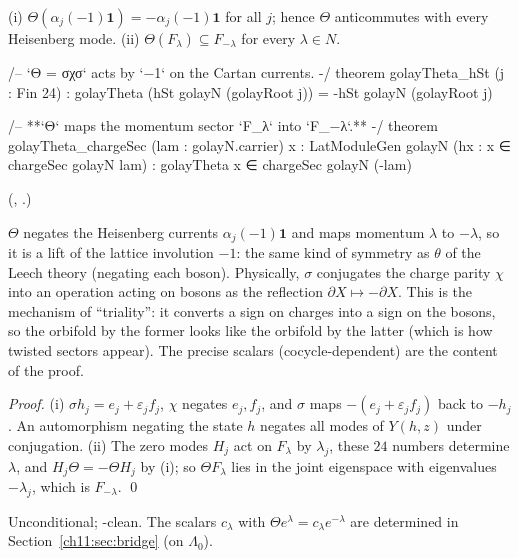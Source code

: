 \begin{theorem}\label{ch11:thm:theta}
(i) $\Theta(\alpha_j(-1)\mathbf 1)=-\alpha_j(-1)\mathbf 1$ for all $j$; hence $\Theta$ anticommutes with
every Heisenberg mode.  (ii) $\Theta(F_\lambda)\subseteq F_{-\lambda}$ for every $\lambda\in N$.
\end{theorem}
\begin{leancode}
/-- `Θ = σχσ` acts by `−1` on the Cartan currents. -/
theorem golayTheta_hSt (j : Fin 24) :
    golayTheta (hSt golayN (golayRoot j)) = -hSt golayN (golayRoot j)

/-- **`Θ` maps the momentum sector `F_λ` into `F_{−λ}`.** -/
theorem golayTheta_chargeSec (lam : golayN.carrier) {x : LatModuleGen golayN}
    (hx : x ∈ chargeSec golayN lam) : golayTheta x ∈ chargeSec golayN (-lam)
\end{leancode}
(, .)

\begin{physics}
$\Theta$ negates the Heisenberg currents $\alpha_j(-1)\mathbf 1$ and maps momentum $\lambda$ to $-\lambda$, so it is a lift of the lattice involution $-1$: the same kind of symmetry as $\theta$ of the Leech theory (negating each boson). Physically, $\sigma$ conjugates the charge parity $\chi$ into an operation acting on bosons as the reflection $\partial X\mapsto-\partial X$. This is the mechanism of ``triality'': it converts a sign on charges into a sign on the bosons, so the orbifold by the former looks like the orbifold by the latter (which is how twisted sectors appear). The precise scalars (cocycle-dependent) are the content of the proof.
\end{physics}
\emph{Proof.}  (i) $\sigma h_j=e_j+\varepsilon_jf_j$, $\chi$ negates $e_j,f_j$, and $\sigma$ maps
$-(e_j+\varepsilon_jf_j)$ back to $-h_j$.  An automorphism negating the state $h$ negates all modes of
$Y(h,z)$ under conjugation.  (ii) The zero modes $H_j$ act on $F_\lambda$ by $\lambda_j$, these $24$
numbers determine $\lambda$, and $H_j\Theta=-\Theta H_j$ by (i); so $\Theta F_\lambda$ lies in the
joint eigenspace with eigenvalues $-\lambda_j$, which is $F_{-\lambda}$. \qed
\begin{status}Unconditional; -clean.  The scalars
$c_\lambda$ with $\Theta e^\lambda=c_\lambda e^{-\lambda}$ are determined in Section~\ref{ch11:sec:bridge}
(on $\Lambda_0$).\end{status}

